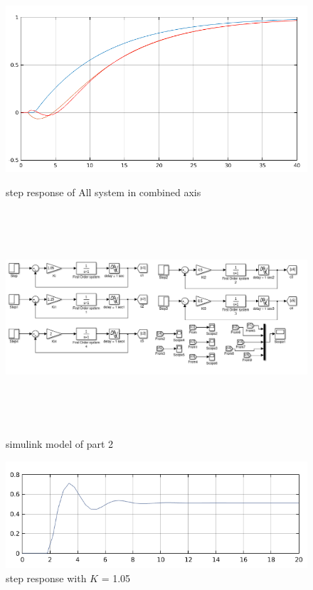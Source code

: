 \message{ !name(lab1.tex)}\documentclass[a4paper,12pt,openany]{book}
\begin{document}
\begin{figure}[H]
  \centering
  \includegraphics[width = 165mm, scale = 0.85]{lab03part12.png}
  \caption{step response of All system in combined axis}
   \includegraphics[width = 165mm, height = 80mm, scale = 0.85]{lab03part2a.png}
   \caption{simulink model of part 2}
   \includegraphics[width = 165mm, scale = 0.85]{lab03part2a1.png}
   \caption{step response with $K$ = 1.05}
 \end{figure}
\end{document}
